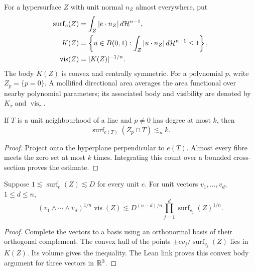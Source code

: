 \begin{definition}
\label{def:visibility}
For a hypersurface $Z$ with unit normal $n_Z$ almost everywhere, put
\begin{align*}
 \operatorname{surf}_e(Z)&=\int_Z|e\cdot n_Z|\,d\mathcal{H}^{n-1},\\
 K(Z)&=\left\{u\in B(0,1):
                    \int_Z|u\cdot n_Z|\,d\mathcal{H}^{n-1}\leq1\right\},\\
 \operatorname{vis}(Z)&=|K(Z)|^{-1/n}.
\end{align*}
The body $K(Z)$ is convex and centrally symmetric. For a polynomial
$p$, write $Z_p=\{p=0\}$. A mollified directional area averages the
area functional over nearby polynomial parameters; its associated
body and visibility are denoted by $K_\tau$ and
$\operatorname{vis}_\tau$.
\end{definition}

\begin{lemma}
\label{lem:cv-cylinder}
If $T$ is a unit neighbourhood of a line and $p\ne0$ has degree at
most $k$, then
\[
                \operatorname{surf}_{e(T)}(Z_p\cap T)\lesssim_n k.
\]
\end{lemma}
\begin{proof}
Project onto the hyperplane perpendicular to $e(T)$. Almost every
fibre meets the zero set at most $k$ times. Integrating this count
over a bounded cross-section proves the estimate.
\end{proof}

\begin{lemma}
\label{lem:cv-directions}
Suppose $1\lesssim\operatorname{surf}_e(Z)\lesssim D$ for every
unit $e$. For unit vectors $v_1,\ldots,v_d$, $1\leq d\leq n$,
\[
 (v_1\wedge\cdots\wedge v_d)^{1/n}\operatorname{vis}(Z)
   \lesssim D^{(n-d)/n}
              \prod_{j=1}^d\operatorname{surf}_{v_j}(Z)^{1/n}.
\]
\end{lemma}
\begin{proof}
Complete the vectors to a basis using an orthonormal basis of their
orthogonal complement. The convex hull of the points
$\pm c v_j/\operatorname{surf}_{v_j}(Z)$ lies in $K(Z)$.
Its volume gives the inequality. The Lean link proves this convex
body argument for three vectors in $\mathbb{R}^3$.
\end{proof}

